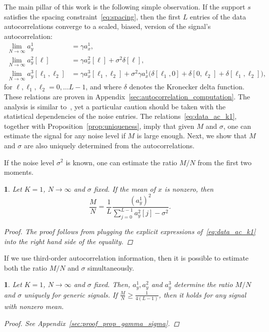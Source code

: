 \documentclass[english,11pt]{article}
\numberwithin{equation}{section}
\theoremstyle{plain}
\theoremstyle{definition}
\theoremstyle{remark}
\theoremstyle{plain}
\theoremstyle{remark}
\theoremstyle{plain}
\theoremstyle{plain}
\newtheorem{proposition}[thm]{\protect\propositionname}
\providecommand{\propositionname}{Proposition}
\begin{document}
The main pillar of this work is the following simple observation.
If the support $s$ satisfies the spacing constraint~\eqref{eq:spacing}, then the first $L$ entries of the data autocorrelations converge 
to a scaled, biased, version of the signal's autocorrelation:
\begin{align}
\lim_{N\to\infty} a_y^1 & = \gamma a_{x}^1, \nonumber\\
\lim_{N\to\infty} a_y^2[\ell] & = \gamma a_{x}^2[\ell] +\sigma^2\delta[\ell], \label{eq:data_ac_k1} \\
\lim_{N\to\infty} a_y^3[\ell_1,\ell_2] & = \gamma a_{x}^3[\ell_1,\ell_2] + \sigma^2\gamma a_{x}^1 \big(\delta[\ell_1,0]+\delta[0,\ell_2]+\delta[\ell_1,\ell_2]\big), \nonumber
\end{align}
for $\ell,\ell_1,\ell_2=0,\ldots L-1$, and where $\delta$ denotes the Kronecker delta function. 
These relations are proven in Appendix~\ref{sec:autocorrelation_computation}. The analysis is similar to~\cite{bendory2017bispectrum,boumal2017heterogeneous}, yet a particular caution should be taken with the statistical dependencies of the noise entries. 
The relations~\eqref{eq:data_ac_k1}, together with Proposition~\ref{prop:uniqueness}, imply that given $M$ and $\sigma$, one can estimate the signal for any noise level if $M$ is large enough. Next, we show that  $M$ and $\sigma$ are also uniquely determined from the autocorrelations. 

If the noise level $\sigma^2$ is known, one can estimate the ratio $M/N$ from the first two moments.
\begin{proposition} \label{prop:gamma}
	Let $K=1$, $N\to\infty$ and $\sigma$ fixed. If the mean of $x$ is nonzero, then 
	\begin{equation*}
	\frac{M}{N} = \frac{1}{L}\frac{(a^1_y)^2}{\sum_{j=0}^{L-1}a_y^2[j]-\sigma^2}.
	\end{equation*}
	\begin{proof}
The proof follows from plugging the explicit expressions of~\eqref{eq:data_ac_k1} into the right hand side of the equality.
\end{proof}
\end{proposition}

If we use third-order autocorrelation information, then it is possible to estimate both the ratio $M/N$ and $\sigma$ simultaneously.
\begin{proposition} \label{prop:gamma_sigma}
	Let $K=1$, $N\to\infty$ and $\sigma$ fixed. Then, $a_y^1,a_y^2$ and  $a_y^3$ determine the ratio $M/N$ and $\sigma$ uniquely for generic signals. If $\frac{M}{N}\geq\frac{1}{4(L-1)}$, then it holds for any signal with nonzero mean. 
	\begin{proof}
		See Appendix~\ref{sec:proof_prop_gamma_sigma}.
	\end{proof}
\end{proposition}
\end{document}

